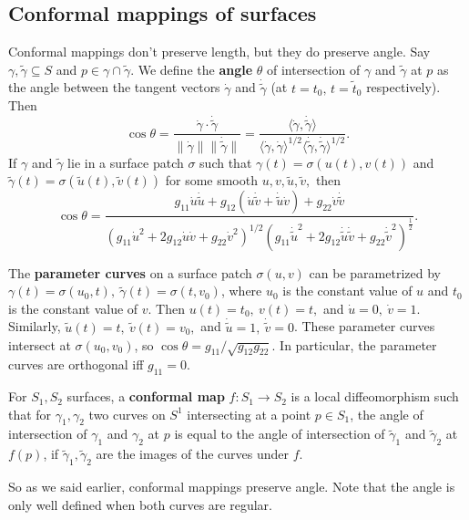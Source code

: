 \subsection{Conformal mappings of surfaces}
Conformal mappings don't preserve length, but they do preserve angle. Say $\gamma ,\widetilde \gamma  \subseteq S$ and $p \in \gamma \cap \widetilde \gamma $. We define the \textbf{angle} $\theta$ of intersection of $\gamma $ and $\widetilde \gamma $ at $p$ as the angle between the tangent vectors $\dot \gamma $ and $\dot{\widetilde \gamma } $ (at $t=t_0,\, t=\widetilde t_0$ respectively). Then \[
\cos \theta= \frac{\dot \gamma \cdot \dot{\widetilde \gamma } }{\|\dot \gamma \|\|\dot {\widetilde \gamma } \|}= \frac{\langle \dot \gamma ,\dot{\widetilde \gamma }  \rangle }{\langle \dot \gamma ,\dot \gamma  \rangle ^{1 /2}\langle \dot{\widetilde \gamma } ,\dot{\widetilde \gamma }  \rangle ^{1 /2}}.
\] If $\gamma $ and $\widetilde \gamma $ lie in a surface patch $\sigma$ such that $\gamma (t)=\sigma(u(t),v(t))$ and $\widetilde \gamma (t)=\sigma(\widetilde u(t),\widetilde v(t))$ for some smooth $u,v,\widetilde u,\widetilde v,$ then \[
\cos\theta= \frac{g_{11}\dot u \dot {\widetilde u} +g_{12}(\dot u \dot{\widetilde v} +\dot{\widetilde u} \dot v)+g_{22}\dot v\dot {\widetilde v}}{(g_{11}\dot u^2+2g_{12}\dot u \dot v+g_{22}\dot v^2)^{1 /2}( g_{11}\dot{\widetilde u} ^2+2g_{12}\dot{\widetilde u} \dot{\widetilde v} +g_{22}\dot{\widetilde v} ^2 ) ^{\frac{1}{2}}}.
\] 
\begin{example}
    The \textbf{parameter curves} on a surface patch $\sigma(u,v)$ can be parametrized by $\gamma (t)=\sigma(u_0,t),\ \widetilde \gamma (t)=\sigma(t,v_0)$, where $u_0$ is the constant value of $u$ and $t_0$ is the constant value of $v$. Then $u(t)=t_0,\ v(t)=t,$ and $\dot u=0, \ \dot v=1$. Similarly, $\widetilde u(t)=t, \ \widetilde v(t)=v_0,$ and $\dot{\widetilde u} =1, \ \dot{\widetilde v} =0$. These parameter curves intersect at $\sigma(u_0,v_0)$, so $\cos \theta= g_{11} / \sqrt{g_{12}g_{22}} $. In particular, the parameter curves are orthogonal iff $g_{11}=0$.
\end{example}

\begin{definition}[]
    For $S_1,S_2$ surfaces, a \textbf{conformal map} $f \colon S_1 \to S_2$ is a local diffeomorphism such that for $\gamma_1,\gamma_2  $ two curves on $S^1 $ intersecting at a point $p \in S_1$, the angle of intersection of $\gamma_1 $ and $\gamma_2 $ at $p$ is equal to the angle of intersection of $\widetilde \gamma_1 $ and $\widetilde \gamma_2 $ at $f(p)$, if  $\widetilde \gamma_1,\widetilde \gamma_2  $ are the images of the curves under $f.$
\end{definition}
So as we said earlier, conformal mappings preserve angle. Note that the angle is only well defined when both curves are regular.

